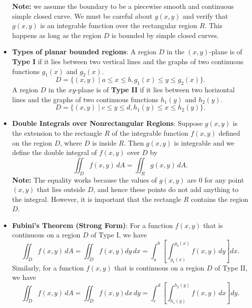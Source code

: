 \documentclass{report}
\begin{document}
\begin{itemize}
\[            \]
            \bigbreak \noindent 
            \textbf{Note:} we assume the boundary to be a piecewise smooth and continuous simple closed curve. We must be careful about \(g(x,y)\) and verify that \(g(x,y)\) is an integrable function over the rectangular region \(R\). This happens as long as the region \(D\) is bounded by simple closed curves.
        \item \textbf{Types of planar bounded regions}:
            A region \(D\) in the \((x,y)\)-plane is of \textbf{Type I} if it lies between two vertical lines and the graphs of two continuous functions \(g_1(x)\) and \(g_2(x)\). 
            \[ D = \{(x,y) \mid a \leq x \leq b, g_1(x) \leq y \leq g_2(x)\}. \]
            \bigbreak \noindent 
            A region \(D\) in the \(xy\)-plane is of \textbf{Type II} if it lies between two horizontal lines and the graphs of two continuous functions \(h_1(y)\) and \(h_2(y)\).
            \[ D = \{(x,y) \mid c \leq y \leq d, h_1(y) \leq x \leq h_2(y)\}. \]
            \bigbreak \noindent 
        \item \textbf{Double Integrals over Nonrectangular Regions}:
            Suppose \(g(x,y)\) is the extension to the rectangle \(R\) of the integrable function \(f(x,y)\) defined on the region \(D\), where \(D\) is inside \(R\). Then \(g(x,y)\) is integrable and we define the double integral of \(f(x,y)\) over \(D\) by
            \[
                \iint_{D} f(x,y) \, dA = \iint_{R} g(x,y) \, dA.
            \]
            \bigbreak \noindent 
            \textbf{Note:} The equality works because the values of \(g(x,y)\) are \(0\) for any point \((x,y)\) that lies outside \(D\), and hence these points do not add anything to the integral. However, it is important that the rectangle \(R\) contains the region \(D\).
        \item \textbf{Fubini’s Theorem (Strong Form)}:
            For a function \(f(x,y)\) that is continuous on a region \(D\) of Type I, we have
            \begin{equation}
                \iint_{D} f(x,y) \, dA = \iint_{D}f(x,y)dy\, dx= \int_{a}^{b} \left[ \int_{g_1(x)}^{g_2(x)} f(x,y) \, dy \right] dx.
            \end{equation}
            Similarly, for a function \(f(x,y)\) that is continuous on a region \(D\) of Type II, we have
            \begin{equation}
                \iint_{D} f(x,y) \, dA  = \iint_{D}f(x,y)dx\, dy= \int_{c}^{d} \left[ \int_{h_1(y)}^{h_2(y)} f(x,y) \, dx \right] dy.

\end{equation}
\end{itemize}
\end{document}
